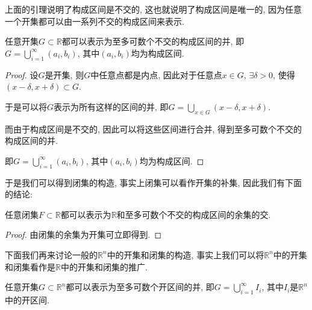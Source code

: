 \documentclass[theorem=false,mathfont=none,openany,sub3section]{easybook}
\begin{document}
\begin{remark}
  上面的引理说明了构成区间是不交的, 这也就说明了构成区间是唯一的, 因为任意一个开集都可以由一系列不交的构成区间来表示.\par
\end{remark}

\begin{theorem}
  任意开集$G\subset \mathbb{R}$都可以表示为至多可数个不交的构成区间的并, 即$G=\bigcup_{i=1}^{\infty}(a_i,b_i)$, 其中$(a_i,b_i)$均为构成区间.\par
\end{theorem}

\begin{proof}
  设$G$是开集, 则$G$中任意点都是内点, 因此对于任意点$x\in G$, $\exists \delta >0$, 使得$(x-\delta,x+\delta)\subset G$.\par
  于是可以将$G$表示为所有这样的区间的并, 即$G=\bigcup_{x\in G}(x-\delta,x+\delta)$.\par
  而由于构成区间是不交的, 因此可以将这些区间进行合并, 得到至多可数个不交的构成区间的并.\par
  即$G=\bigcup_{i=1}^{\infty}(a_i,b_i)$, 其中$(a_i,b_i)$均为构成区间.\par
\end{proof}

于是我们可以得到闭集的构造, 事实上闭集可以看作开集的补集, 因此我们有下面的结论:\par

\begin{theorem}
  任意闭集$F\subset \mathbb{R}$都可以表示为$\mathbb{R}$和至多可数个不交的构成区间的余集的交.\par
\end{theorem}

\begin{proof}
  由闭集的余集为开集可立即得到.\par
\end{proof}

下面我们再来讨论一般的$\mathbb{R}^n$中的开集和闭集的构造, 事实上我们可以将$\mathbb{R}^n$中的开集和闭集看作是$\mathbb{R}$中的开集和闭集的推广.\par

\begin{theorem}
  任意开集$G\subset \mathbb{R}^n$都可以表示为至多可数个开区间的并, 即$G=\bigcup_{i=1}^{\infty}I_i$, 其中$I_i$是$\mathbb{R}^n$中的开区间.\par
\end{theorem}
\end{document}
